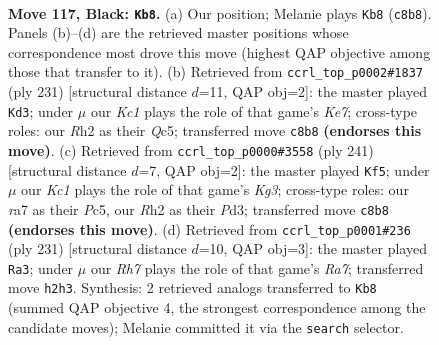 \documentclass[11pt]{article}
\begin{document}
\clearpage

\begin{figure}[p]\centering
\begin{subfigure}{0.46\textwidth}\centering
\resizebox{\linewidth}{!}{%
\newchessgame
\chessboard[
  setfen={2k5/R7/4p3/4P3/5PR1/8/7r/5K2 b - - 20 117},
  showmover=false,
  pgfstyle=straightmove, color=movearrow, markmove={c8-b8}
]}
\caption{}
\end{subfigure}\hfill
\begin{subfigure}{0.46\textwidth}\centering
\resizebox{\linewidth}{!}{%
\newchessgame
\chessboard[
  setfen={8/5R2/7p/2q5/8/7P/4k1P1/7K b - - 17 116},
  showmover=false,
  pgfstyle=straightmove, color=movearrow, markmove={e2-d3}
]}
\caption{}
\end{subfigure}
\\[4pt]
\begin{subfigure}{0.46\textwidth}\centering
\resizebox{\linewidth}{!}{%
\newchessgame
\chessboard[
  setfen={8/8/6k1/1Pp5/P3R3/3p4/8/1K6 b - - 0 121},
  showmover=false,
  pgfstyle=straightmove, color=movearrow, markmove={g6-f5}
]}
\caption{}
\end{subfigure}\hfill
\begin{subfigure}{0.46\textwidth}\centering
\resizebox{\linewidth}{!}{%
\newchessgame
\chessboard[
  setfen={8/8/2R5/4p1k1/4P3/5PK1/r7/8 b - - 0 116},
  showmover=false,
  pgfstyle=straightmove, color=movearrow, markmove={a2-a3}
]}
\caption{}
\end{subfigure}
\caption{\textbf{Move 117, Black: \texttt{Kb8}.} (a) Our position; Melanie plays \texttt{Kb8} (\texttt{c8b8}). Panels (b)--(d) are the retrieved master positions whose correspondence most drove this move (highest QAP objective among those that transfer to it). (b) Retrieved from \texttt{ccrl\_top\_p0002\#1837} (ply 231) [structural distance $d$=11, QAP obj=2]: the master played \texttt{Kd3}; under $\mu$ our \emph{Kc1} plays the role of that game's \emph{Ke7}; cross-type roles: our \emph{R}h2 as their \emph{Q}c5; transferred move \texttt{c8b8} \textbf{(endorses this move)}. (c) Retrieved from \texttt{ccrl\_top\_p0000\#3558} (ply 241) [structural distance $d$=7, QAP obj=2]: the master played \texttt{Kf5}; under $\mu$ our \emph{Kc1} plays the role of that game's \emph{Kg3}; cross-type roles: our \emph{r}a7 as their \emph{P}c5, our \emph{R}h2 as their \emph{P}d3; transferred move \texttt{c8b8} \textbf{(endorses this move)}. (d) Retrieved from \texttt{ccrl\_top\_p0001\#236} (ply 231) [structural distance $d$=10, QAP obj=3]: the master played \texttt{Ra3}; under $\mu$ our \emph{Rh7} plays the role of that game's \emph{Ra7}; transferred move \texttt{h2h3}. Synthesis: 2 retrieved analogs transferred to \texttt{Kb8} (summed QAP objective 4, the strongest correspondence among the candidate moves); Melanie committed it via the \texttt{search} selector.}
\label{fig:thought-m233}
\end{figure}
\end{document}
